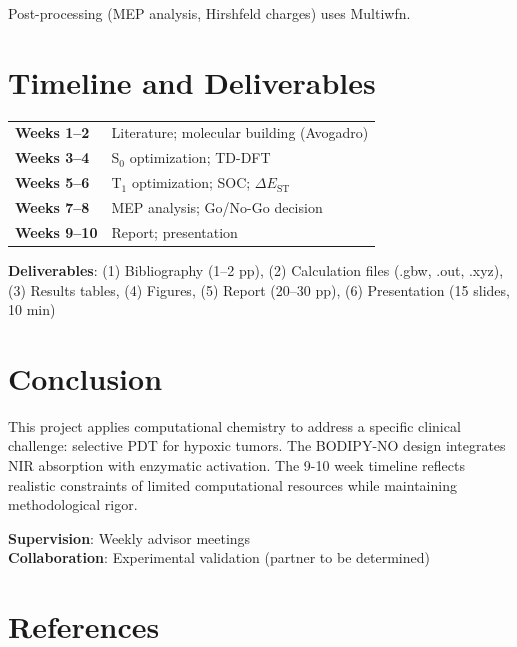 \documentclass[12pt,a4paper]{article}
\begin{document}
Post-processing (MEP analysis, Hirshfeld charges) uses Multiwfn.

\section{Timeline and Deliverables}

\begin{table}[h]
\centering
\footnotesize
\begin{tabular}{@{}ll@{}}
\toprule
\textbf{Weeks 1--2} & Literature; molecular building (Avogadro) \\
\textbf{Weeks 3--4} & S$_0$ optimization; TD-DFT \\
\textbf{Weeks 5--6} & T$_1$ optimization; SOC; $\Delta E_{\text{ST}}$ \\
\textbf{Weeks 7--8} & MEP analysis; Go/No-Go decision \\
\textbf{Weeks 9--10} & Report; presentation \\
\bottomrule
\end{tabular}
\end{table}

\textbf{Deliverables}: (1) Bibliography (1--2 pp), (2) Calculation files (.gbw, .out, .xyz), (3) Results tables, (4) Figures, (5) Report (20--30 pp), (6) Presentation (15 slides, 10 min)

\section{Conclusion}

This project applies computational chemistry to address a specific clinical challenge: selective PDT for hypoxic tumors. The BODIPY-NO design integrates NIR absorption with enzymatic activation. The 9-10 week timeline reflects realistic constraints of limited computational resources while maintaining methodological rigor.

\vspace{0.5em}
\noindent\textbf{Supervision}: Weekly advisor meetings \\
\textbf{Collaboration}: Experimental validation (partner to be determined)

\section*{References}
\end{document}
